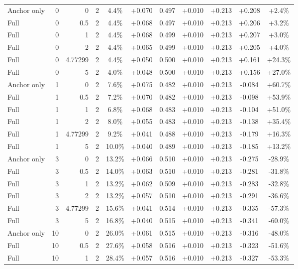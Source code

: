 \begin{table}[htbp]
\begin{tabular}{lrrrccccccc}
Anchor only & 0 & 0 & 2 & 4.4\% & +0.070 & 0.497 & +0.010 & +0.213 & +0.208 & +2.4\% \\
Full & 0 & 0.5 & 2 & 4.4\% & +0.068 & 0.497 & +0.010 & +0.213 & +0.206 & +3.2\% \\
Full & 0 & 1 & 2 & 4.4\% & +0.068 & 0.499 & +0.010 & +0.213 & +0.207 & +3.0\% \\
Full & 0 & 2 & 2 & 4.4\% & +0.065 & 0.499 & +0.010 & +0.213 & +0.205 & +4.0\% \\
Full & 0 & 4.77299 & 2 & 4.4\% & +0.050 & 0.500 & +0.010 & +0.213 & +0.161 & +24.3\% \\
Full & 0 & 5 & 2 & 4.0\% & +0.048 & 0.500 & +0.010 & +0.213 & +0.156 & +27.0\% \\
Anchor only & 1 & 0 & 2 & 7.6\% & +0.075 & 0.482 & +0.010 & +0.213 & -0.084 & +60.7\% \\
Full & 1 & 0.5 & 2 & 7.2\% & +0.070 & 0.482 & +0.010 & +0.213 & -0.098 & +53.9\% \\
Full & 1 & 1 & 2 & 6.8\% & +0.068 & 0.483 & +0.010 & +0.213 & -0.104 & +51.0\% \\
Full & 1 & 2 & 2 & 8.0\% & +0.055 & 0.483 & +0.010 & +0.213 & -0.138 & +35.4\% \\
Full & 1 & 4.77299 & 2 & 9.2\% & +0.041 & 0.488 & +0.010 & +0.213 & -0.179 & +16.3\% \\
Full & 1 & 5 & 2 & 10.0\% & +0.040 & 0.489 & +0.010 & +0.213 & -0.185 & +13.2\% \\
Anchor only & 3 & 0 & 2 & 13.2\% & +0.066 & 0.510 & +0.010 & +0.213 & -0.275 & -28.9\% \\
Full & 3 & 0.5 & 2 & 14.0\% & +0.063 & 0.510 & +0.010 & +0.213 & -0.281 & -31.8\% \\
Full & 3 & 1 & 2 & 13.2\% & +0.062 & 0.509 & +0.010 & +0.213 & -0.283 & -32.8\% \\
Full & 3 & 2 & 2 & 13.2\% & +0.057 & 0.510 & +0.010 & +0.213 & -0.291 & -36.6\% \\
Full & 3 & 4.77299 & 2 & 15.6\% & +0.041 & 0.514 & +0.010 & +0.213 & -0.335 & -57.3\% \\
Full & 3 & 5 & 2 & 16.8\% & +0.040 & 0.515 & +0.010 & +0.213 & -0.341 & -60.0\% \\
Anchor only & 10 & 0 & 2 & 26.0\% & +0.061 & 0.515 & +0.010 & +0.213 & -0.316 & -48.0\% \\
Full & 10 & 0.5 & 2 & 27.6\% & +0.058 & 0.516 & +0.010 & +0.213 & -0.323 & -51.6\% \\
Full & 10 & 1 & 2 & 28.4\% & +0.057 & 0.516 & +0.010 & +0.213 & -0.327 & -53.3\% \\

\end{tabular}
\end{table}
